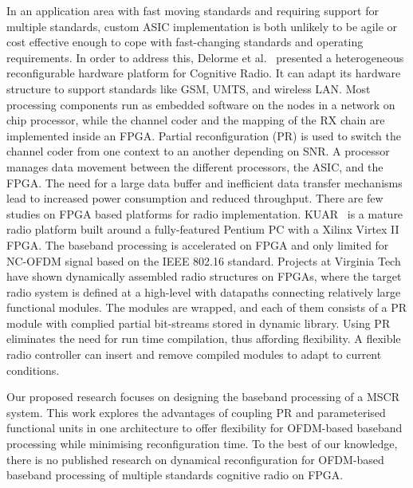 In an application area with fast moving standards and requiring support for multiple standards, custom ASIC implementation is both unlikely to be agile or cost effective enough to cope with fast-changing standards and operating requirements. 
In order to address this, Delorme et al.~\cite{Delorme2008} presented a heterogeneous reconfigurable hardware platform for Cognitive Radio. 
It can adapt its hardware structure to support standards like GSM, UMTS, and wireless LAN. 
Most processing components run as embedded software on the nodes in a network on chip processor, while the channel coder and the mapping of the RX chain are implemented inside an FPGA. 
Partial reconfiguration (PR) is used to switch the channel coder from one context to an another depending on SNR. 
A processor manages data movement between the different processors, the ASIC, and the FPGA. The need for a large data buffer and inefficient data transfer mechanisms lead to increased power consumption and reduced throughput.
There are few studies on FPGA based platforms for radio implementation. 
KUAR~\cite{Minden2007} is a mature radio platform built around a fully-featured Pentium PC with a Xilinx Virtex II FPGA. 
The baseband processing is accelerated on FPGA and only limited for NC-OFDM signal based on the IEEE 802.16 standard.
Projects at Virginia Tech~\cite{athanaswires} have shown dynamically assembled radio structures on FPGAs, where the target radio system is defined at a high-level with datapaths connecting relatively large functional modules. 
The modules are wrapped, and each of them consists of a PR module with complied partial bit-streams stored in dynamic library. 
Using PR eliminates the need for run time compilation, thus affording flexibility. 
A flexible radio controller can insert and remove compiled modules to adapt to current conditions.

Our proposed research focuses on designing the baseband processing of a MSCR system.
This work explores the advantages of coupling PR and parameterised functional units in one architecture to offer flexibility for OFDM-based baseband processing while minimising reconfiguration time. 
To the best of our knowledge, there is no published research on dynamical reconfiguration for OFDM-based baseband processing of multiple standards cognitive radio on FPGA.


